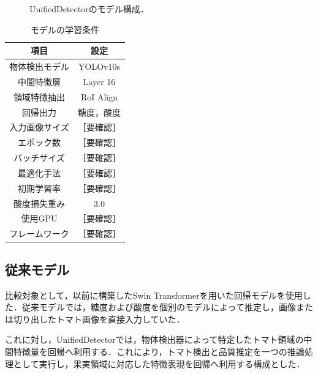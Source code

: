 \documentclass[authorproof,JRM,paper]{fujipressarticle}
\begin{document}
\begin{figure}[t]
\centering
{}
\caption{UnifiedDetectorのモデル構成．}
\label{fig:unified_detector_architecture}
\end{figure}

\begin{table}[t]
	\begin{center}
		\caption{モデルの学習条件}
		\label{tab:training_conditions}
		\renewcommand{\arraystretch}{1.5}
		\begin{tabular}{|c|c|}
			\hline
			\textbf{項目} & \textbf{設定} \\ \hline
			物体検出モデル & YOLOv10s \\ \hline
			中間特徴層 & Layer 16 \\ \hline
			領域特徴抽出 & RoI Align \\ \hline
			回帰出力 & 糖度，酸度 \\ \hline
			入力画像サイズ & ［要確認］ \\ \hline
			エポック数 & ［要確認］ \\ \hline
			バッチサイズ & ［要確認］ \\ \hline
			最適化手法 & ［要確認］ \\ \hline
			初期学習率 & ［要確認］ \\ \hline
			酸度損失重み & 3.0 \\ \hline
			使用GPU & ［要確認］ \\ \hline
			フレームワーク & ［要確認］ \\ \hline
		\end{tabular}
	\end{center}
\end{table}

\subsection{従来モデル}

比較対象として，以前に構築したSwin Transformerを用いた回帰モデルを使用した．従来モデルでは，糖度および酸度を個別のモデルによって推定し，画像または切り出したトマト画像を直接入力していた．

これに対し，UnifiedDetectorでは，物体検出器によって特定したトマト領域の中間特徴量を回帰へ利用する．これにより，トマト検出と品質推定を一つの推論処理として実行し，果実領域に対応した特徴表現を回帰へ利用する構成とした．
\end{document}
